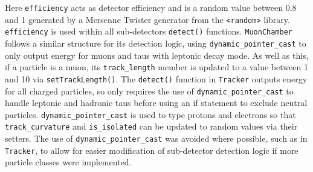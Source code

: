 \documentclass[12pt]{report}
\begin{document}
Here \texttt{efficiency} acts as detector efficiency and is a random value between 0.8 and 1 generated by  a Mersenne Twister generator from the \texttt{<random>} library. \texttt{efficiency} is used within all sub-detectors \texttt{detect()} functions. \texttt{MuonChamber} follows a similar structure for its detection logic, using \texttt{dynamic\_pointer\_cast} to only output energy for muons and taus with leptonic decay mode. As well as this, if a particle is a muon, its \texttt{track\_length} member is updated to a value between 1 and 10 via \texttt{setTrackLength()}. The \texttt{detect()} function in \texttt{Tracker} outputs energy for all charged particles, so only requires the use of \texttt{dynamic\_pointer\_cast} to handle leptonic and hadronic taus before using an if statement to exclude neutral particles. \texttt{dynamic\_pointer\_cast} is used to type protons and electrons so that \texttt{track\_curvature} and \texttt{is\_isolated} can be updated to random values via their setters. The use of \texttt{dynamic\_pointer\_cast} was avoided where possible, such as in \texttt{Tracker}, to allow for easier modification of sub-detector detection logic if more particle classes were implemented.\\
\end{document}
